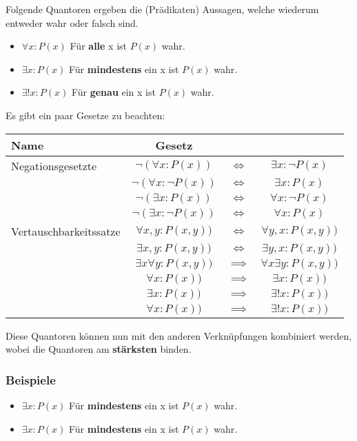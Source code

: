 \documentclass[a4paper,12pt]{article}
\begin{document}
Folgende Quantoren ergeben die (Prädikaten) Aussagen, welche wiederum entweder wahr oder falsch sind.
\begin{itemize}
  \item $\forall x : P(x)$ Für \textbf{alle} x ist $P(x)$ wahr.
  \item $\exists x : P(x)$ Für \textbf{mindestens} ein x ist $P(x)$ wahr.
  \item $\exists! x : P(x)$ Für \textbf{genau} ein x ist $P(x)$ wahr.
\end{itemize}

Es gibt ein paar Gesetze zu beachten:

\begin{tabular}{l|ccc}
  \textbf{Name} & \textbf{Gesetz} \\
  \hline
  Negationsgesetzte & \(\neg ( \forall x : P(x)) \) & $\iff$ & $\exists x : \neg P(x) $\\
   & \(\neg ( \forall x : \neg P(x))\) & $ \iff $ & $\exists x :  P(x)$  \\
   & \(\neg ( \exists x :  P(x))\) & $\iff$ & \(\forall x : \neg P(x)\)  \\   
   & \(\neg ( \exists x : \neg P(x))\) & $ \iff $ & \(\forall x :  P(x)\)  \\
  \hline
  Vertauschbarkeitssatze & \( \forall x,y : P(x, y)) \) & $\iff$ & $\forall y,x : P(x, y)) $\\
   & \( \exists x,y : P(x, y)) \) & $\iff$ & $\exists y,x : P(x, y)) $\\
   & \( \exists x \forall y : P(x, y)) \) & $\implies$ & $\forall x \exists y : P(x, y))  $\\  
   \hline
   & \( \forall x  : P(x)) \) & $\implies$ & $\exists x : P(x))  $\\
   & \( \exists x : P(x)) \) & $\implies$ & $\exists! x : P(x))  $\\
   & \( \forall x : P(x)) \) & $\implies$ & $\exists! x : P(x))  $\\
  \end{tabular}

Diese Quantoren können nun mit den anderen Verknüpfungen kombiniert werden, wobei die Quantoren am \textbf{stärksten} binden.
\subsubsection{Beispiele}
\begin{itemize}
  \item $\exists x : P(x)$ Für \textbf{mindestens} ein x ist $P(x)$ wahr.
  \item $\exists x : P(x)$ Für \textbf{mindestens} ein x ist $P(x)$ wahr.
\end{itemize}
\end{document}
